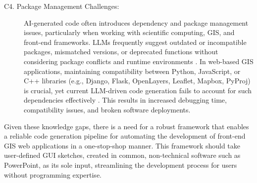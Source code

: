 \begin{description}
   \item[C4. Package Management Challenges:] AI-generated code often introduces dependency and package management issues, particularly when working with scientific computing, GIS, and front-end frameworks. LLMs frequently suggest outdated or incompatible packages, mismatched versions, or deprecated functions without considering package conflicts and runtime environments \citep{hou2024can}. In web-based GIS applications, maintaining compatibility between Python, JavaScript, or C++ libraries (e.g., Django, Flask, OpenLayers, Leaflet, Mapbox, PyProj) is crucial, yet current LLM-driven code generation fails to account for such dependencies effectively \citep{mahmoudi2023development}. This results in increased debugging time, compatibility issues, and broken software deployments.
\end{description}

Given these knowledge gaps, there is a need for a robust framework that enables a reliable code generation pipeline for automating the development of front-end GIS web applications in a one-stop-shop manner. This framework should take user-defined GUI sketches, created in common, non-technical software such as PowerPoint, as its sole input, streamlining the development process for users without programming expertise. 

 